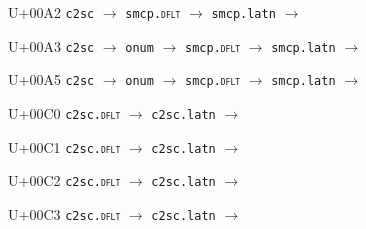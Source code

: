 \documentclass{article}
\begin{document}
\begin{substitutions}

U+00A2  \linebreak
    \texttt{c2sc} $\to$  \linebreak
    \texttt{smcp.\textsc{dflt}} $\to$  \linebreak
    \texttt{smcp.latn} $\to$  

\goodbreak

U+00A3  \linebreak
    \texttt{c2sc} $\to$  \linebreak
    \texttt{onum} $\to$  \linebreak
    \texttt{smcp.\textsc{dflt}} $\to$  \linebreak
    \texttt{smcp.latn} $\to$  

\goodbreak

U+00A5  \linebreak
    \texttt{c2sc} $\to$  \linebreak
    \texttt{onum} $\to$  \linebreak
    \texttt{smcp.\textsc{dflt}} $\to$  \linebreak
    \texttt{smcp.latn} $\to$  

\goodbreak

U+00C0  \linebreak
    \texttt{c2sc.\textsc{dflt}} $\to$  \linebreak
    \texttt{c2sc.latn} $\to$  

\goodbreak

U+00C1  \linebreak
    \texttt{c2sc.\textsc{dflt}} $\to$  \linebreak
    \texttt{c2sc.latn} $\to$  

\goodbreak

U+00C2  \linebreak
    \texttt{c2sc.\textsc{dflt}} $\to$  \linebreak
    \texttt{c2sc.latn} $\to$  

\goodbreak

U+00C3  \linebreak
    \texttt{c2sc.\textsc{dflt}} $\to$  \linebreak
    \texttt{c2sc.latn} $\to$  


\end{substitutions}
\end{document}

